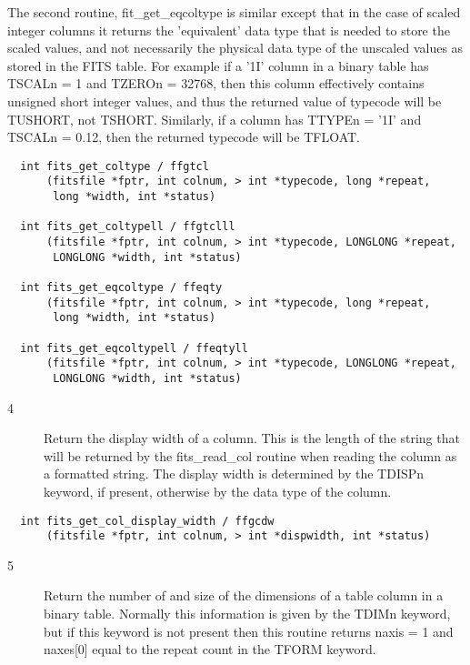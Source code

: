\documentclass[11pt]{book}
\begin{document}
\begin{description}
   The second routine, fit\_get\_eqcoltype is similar except that in
   the case of scaled integer columns it returns the 'equivalent' data
   type that is needed to store the scaled values, and not necessarily
   the physical data type of the unscaled values as stored in the FITS
   table.  For example if a '1I' column in a binary table has TSCALn =
   1 and TZEROn = 32768, then this column effectively contains unsigned
   short integer values, and thus the returned value of typecode will
   be TUSHORT, not TSHORT.  Similarly, if a column has TTYPEn = '1I'
   and TSCALn = 0.12, then the returned typecode
  will be TFLOAT. \label{ffgtcl}
\end{description}

\begin{verbatim}
  int fits_get_coltype / ffgtcl
      (fitsfile *fptr, int colnum, > int *typecode, long *repeat,
       long *width, int *status)

  int fits_get_coltypell / ffgtclll
      (fitsfile *fptr, int colnum, > int *typecode, LONGLONG *repeat,
       LONGLONG *width, int *status)

  int fits_get_eqcoltype / ffeqty
      (fitsfile *fptr, int colnum, > int *typecode, long *repeat,
       long *width, int *status)

  int fits_get_eqcoltypell / ffeqtyll
      (fitsfile *fptr, int colnum, > int *typecode, LONGLONG *repeat,
       LONGLONG *width, int *status)
\end{verbatim}

\begin{description}
\item[4 ] Return the display width of a column.  This is the length
    of the string that will be returned by the fits\_read\_col routine
    when reading the column as a formatted string.  The display width is
    determined by the TDISPn keyword, if present, otherwise by the data
   type of the column. \label{ffgcdw}
\end{description}

\begin{verbatim}
  int fits_get_col_display_width / ffgcdw
      (fitsfile *fptr, int colnum, > int *dispwidth, int *status)
\end{verbatim}


\begin{description}
\item[5 ] Return the number of and size of the dimensions of a table column in
    a binary table. Normally this information is given by the TDIMn keyword,
    but if this keyword is not present then this routine returns naxis = 1
   and naxes[0] equal to the repeat count in the TFORM keyword. \label{ffgtdm}
\end{description}
\end{document}
